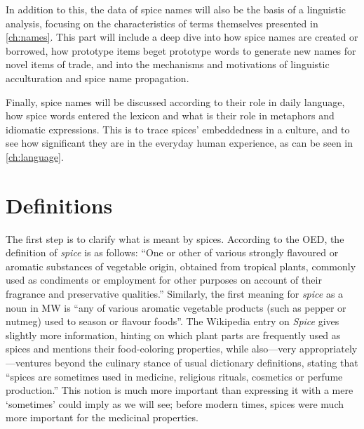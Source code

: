 In addition to this, the data of spice names will also be the basis of a linguistic analysis, focusing on the characteristics of terms themselves presented in \cref{ch:names}. This part will include a deep dive into how spice names are created or borrowed, how prototype items beget prototype words to generate new names for novel items of trade, and into the mechanisms and motivations of linguistic acculturation and spice name propagation.


Finally, spice names will be discussed according to their role in daily language, how spice words entered the lexicon and what is their role in metaphors and idiomatic expressions. This is to trace spices' embeddedness in a culture, and to see how significant they are in the everyday human experience, as can be seen in \cref{ch:language}.


\section{Definitions}


The first step is to clarify what is meant by spices. According to the \gls{OED}, the definition of \textit{spice} is as follows: ``One or other of various strongly flavoured or aromatic substances of vegetable origin, obtained from tropical plants, commonly used as condiments or employment for other purposes on account of their fragrance and preservative qualities.'' Similarly, the first meaning for \textit{spice} as a noun in \gls{MW} is ``any of various aromatic vegetable products (such as pepper or nutmeg) used to season or flavour foods''. The Wikipedia entry on \textit{Spice} gives slightly more information, hinting on which plant parts are frequently used as spices and mentions their food-coloring properties, while also---very appropriately---ventures beyond the culinary stance of usual dictionary definitions, stating that ``spices are sometimes used in medicine, religious rituals, cosmetics or perfume production.'' This notion is much more important than expressing it with a mere `sometimes' could imply as we will see; before modern times, spices were much more important for the medicinal properties.

